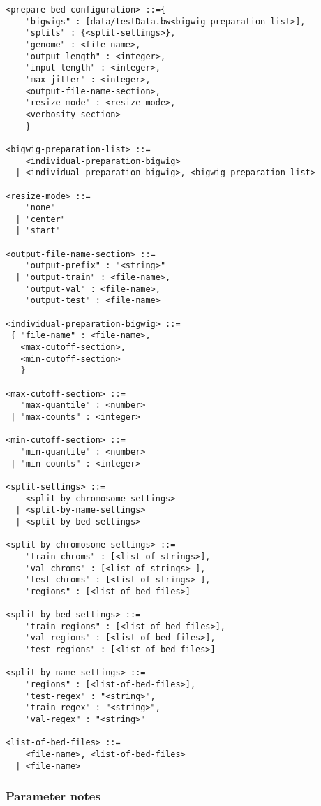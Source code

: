 \documentclass{article}
\begin{document}
\begin{lstlisting}
<prepare-bed-configuration> ::={
    "bigwigs" : [data/testData.bw<bigwig-preparation-list>],
    "splits" : {<split-settings>},
    "genome" : <file-name>,
    "output-length" : <integer>,
    "input-length" : <integer>,
    "max-jitter" : <integer>,
    <output-file-name-section>,
    "resize-mode" : <resize-mode>,
    <verbosity-section>
    }

<bigwig-preparation-list> ::=
    <individual-preparation-bigwig> 
  | <individual-preparation-bigwig>, <bigwig-preparation-list>

<resize-mode> ::= 
    "none"
  | "center"
  | "start"

<output-file-name-section> ::=
    "output-prefix" : "<string>"
  | "output-train" : <file-name>,
    "output-val" : <file-name>,
    "output-test" : <file-name>

<individual-preparation-bigwig> ::=
 { "file-name" : <file-name>,
   <max-cutoff-section>,
   <min-cutoff-section> 
   }

<max-cutoff-section> ::=
   "max-quantile" : <number>
 | "max-counts" : <integer>

<min-cutoff-section> ::=
   "min-quantile" : <number>
 | "min-counts" : <integer>

<split-settings> ::=
    <split-by-chromosome-settings>
  | <split-by-name-settings>
  | <split-by-bed-settings>

<split-by-chromosome-settings> ::=
    "train-chroms" : [<list-of-strings>],
    "val-chroms" : [<list-of-strings> ],
    "test-chroms" : [<list-of-strings> ],
    "regions" : [<list-of-bed-files>]

<split-by-bed-settings> ::=
    "train-regions" : [<list-of-bed-files>],
    "val-regions" : [<list-of-bed-files>],
    "test-regions" : [<list-of-bed-files>]

<split-by-name-settings> ::=
    "regions" : [<list-of-bed-files>],
    "test-regex" : "<string>",
    "train-regex" : "<string>",
    "val-regex" : "<string>"

<list-of-bed-files> ::=
    <file-name>, <list-of-bed-files>
  | <file-name>

\end{lstlisting}

\subsubsection{Parameter notes}
\end{document}

